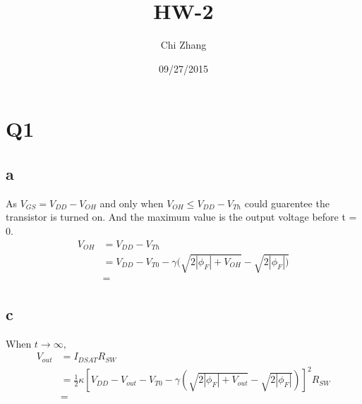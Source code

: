 \documentclass[a4paper,10pt]{article}
\title{HW-2}
\author{Chi Zhang}
\date{09/27/2015}
\begin{document}
\maketitle
\section*{Q1}
\subsection*{a}
As \begin{math}V_{GS} = V_{DD} - V_{OH}\end{math} and only when \begin{math}V_{OH} \leq V_{DD} - V_{Th}\end{math} could 
guarentee the transistor is turned on. And the maximum value is the output voltage before t = 0.
\begin{equation}
\begin{split}
 V_{OH} &= V_{DD} - V_{Th}\\
        &= V_{DD} - V_{T0} - \gamma(\sqrt{2|\phi_F| + V_{OH}} - \sqrt{2|\phi_F|)}\\
        &=
\end{split}
\end{equation}
\subsection*{c}
When \begin{math}t\rightarrow\infty\end{math},
\begin{equation}
\begin{split}
V_{out} &= I_{DSAT}R_{SW}\\
&= \frac{1}{2}\kappa[V_{DD} - V_{out} - V_{T0} - \gamma(\sqrt{2|\phi_F| + V_{out} } - \sqrt{2|\phi_F|})] ^2 R_{SW}\\
&=
\end{split}
\end{equation}
\end{document}

